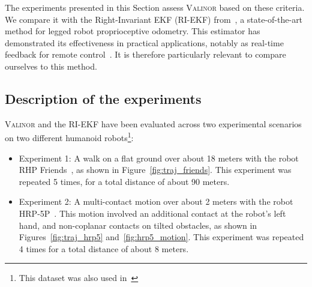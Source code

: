 \documentclass{IJCAS}
\begin{document}
\noindent The experiments presented in this Section assess {\scshape Valinor} based on these criteria. We compare it with the Right-Invariant EKF (RI-EKF) from~\cite{Hartley2020RIEKF}, a state-of-the-art method for legged robot proprioceptive odometry. This estimator has demonstrated its effectiveness in practical applications, notably as real-time feedback for remote control~\cite{Grandia2024DesignControlBipedalRoboticCharacter}. It is therefore particularly relevant to compare ourselves to this method.

\subsection{Description of the experiments}

{\scshape Valinor} and the RI-EKF have been evaluated across two experimental scenarios on two different humanoid robots\footnote{This dataset was also used in~\cite{Demont2024KineticsObserver}}:
\begin{itemize}[leftmargin=0em]
    \item Experiment 1: A walk on a flat ground over about 18 meters with the robot RHP Friends~\cite{Benallegue2025RhpFriendsJRL}, as shown in Figure~\ref{fig:traj_friends}. This experiment was repeated 5 times, for a total distance of about 90 meters.
    \item Experiment 2: A multi-contact motion over about 2 meters with the robot HRP-5P~\cite{Kaneko2019Hrp5}. This motion involved an additional contact at the robot's left hand, and non-coplanar contacts on tilted obstacles, as shown in Figures~\ref{fig:traj_hrp5} and~\ref{fig:hrp5_motion}. This experiment was repeated 4 times for a total distance of about 8 meters.
\end{itemize}
\end{document}

